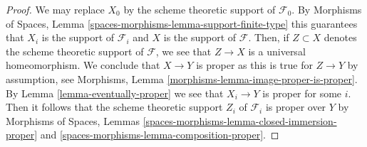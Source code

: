 \documentclass{stacks-project}
\theoremstyle{plain}
\theoremstyle{definition}
\theoremstyle{remark}
\numberwithin{equation}{subsection}
\begin{document}
\begin{proof}
We may replace $X_0$ by the scheme theoretic support of $\mathcal{F}_0$.
By Morphisms of Spaces, Lemma \ref{spaces-morphisms-lemma-support-finite-type}
this guarantees that $X_i$ is the support of $\mathcal{F}_i$ and $X$ is the
support of $\mathcal{F}$. Then, if $Z \subset X$ denotes the scheme
theoretic support of $\mathcal{F}$, we see that $Z \to X$ is a universal
homeomorphism. We conclude that $X \to Y$ is proper as this is true for
$Z \to Y$ by assumption, see
Morphisms, Lemma \ref{morphisms-lemma-image-proper-is-proper}.
By Lemma \ref{lemma-eventually-proper} we see that $X_i \to Y$ is proper
for some $i$. Then it follows that the scheme theoretic support $Z_i$ of
$\mathcal{F}_i$ is proper over $Y$ by
Morphisms of Spaces, Lemmas
\ref{spaces-morphisms-lemma-closed-immersion-proper} and
\ref{spaces-morphisms-lemma-composition-proper}.
\end{proof}
\end{document}
